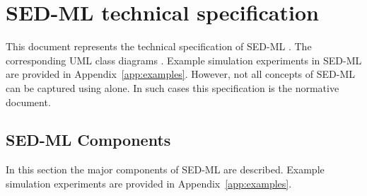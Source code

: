 \documentclass[pdftex,rgb,dvipsnames,svgnames,hyperref,table]{report}
\begin{document}

\sedmltableofcontents
\newpage


\chapter{SED-ML technical specification}
\label{chp:specification}
This document represents the technical specification of SED-ML \currentLV. The corresponding UML class diagrams . Example simulation experiments in SED-ML are provided in Appendix~\ref{app:examples}.
However, not all concepts of SED-ML can be captured using  alone. In such cases this specification is the normative document. 





\pagebreak
\section{SED-ML Components}
\label{sec:components}
In this section the major components of SED-ML are described.   Example simulation experiments are provided in Appendix~\ref{app:examples}.%












%


%

\end{document}
